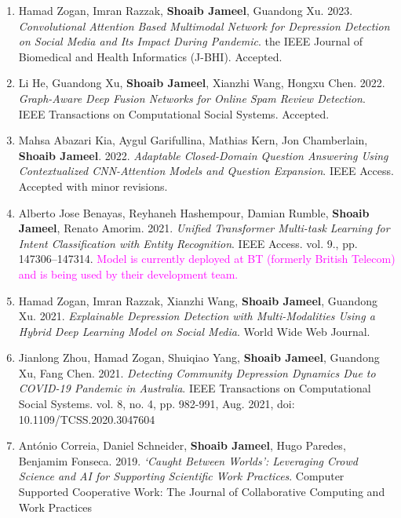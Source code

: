 \documentclass[margin]{res}
\begin{document}
\begin{resume}
\begin{enumerate}
    \item Hamad Zogan, Imran Razzak, \textbf{Shoaib Jameel}, Guandong Xu. 2023. \textit{Convolutional Attention Based Multimodal Network for Depression Detection on Social Media and Its Impact During Pandemic}. the IEEE Journal of Biomedical and Health Informatics (J-BHI). Accepted. \newline
    \item Li He, Guandong Xu, \textbf{Shoaib Jameel}, Xianzhi Wang, Hongxu Chen. 2022. \textit{Graph-Aware Deep Fusion Networks for Online Spam Review Detection}. IEEE Transactions on Computational Social Systems. Accepted. \newline
    \item Mahsa Abazari Kia, Aygul Garifullina, Mathias Kern, Jon Chamberlain, \textbf{Shoaib Jameel}. 2022. \textit{Adaptable Closed-Domain Question Answering Using Contextualized CNN-Attention Models and Question Expansion}. IEEE Access. Accepted with minor revisions. \newline
    \item Alberto Jose Benayas, Reyhaneh Hashempour, Damian Rumble, \textbf{Shoaib Jameel}, Renato Amorim. 2021. \textit{Unified Transformer Multi-task Learning for Intent Classification with Entity Recognition}. IEEE Access. vol. 9., pp. 147306--147314. \textcolor{magenta}{Model is currently deployed at BT (formerly British Telecom) and is being used by their development team.}  \newline
    \item Hamad Zogan, Imran Razzak, Xianzhi Wang, \textbf{Shoaib Jameel}, Guandong Xu. 2021. \textit{Explainable Depression Detection with Multi-Modalities Using a Hybrid Deep Learning Model on Social Media}. World Wide Web Journal. \\
    \item Jianlong Zhou, Hamad Zogan, Shuiqiao Yang, \textbf{Shoaib Jameel}, Guandong Xu, Fang Chen. 2021. \textit{Detecting Community Depression Dynamics Due to COVID-19 Pandemic in Australia}. IEEE Transactions on Computational Social Systems. vol. 8, no. 4, pp. 982-991, Aug. 2021, doi: 10.1109/TCSS.2020.3047604 \\
    \item Ant\'onio Correia, Daniel Schneider, \textbf{Shoaib Jameel}, Hugo Paredes, Benjamim Fonseca. 2019. \textit{`Caught Between Worlds': Leveraging Crowd Science and AI for Supporting Scientific Work Practices}. Computer Supported Cooperative Work: The Journal of Collaborative Computing and Work Practices \\


\end{enumerate}
\end{resume}
\end{document}
